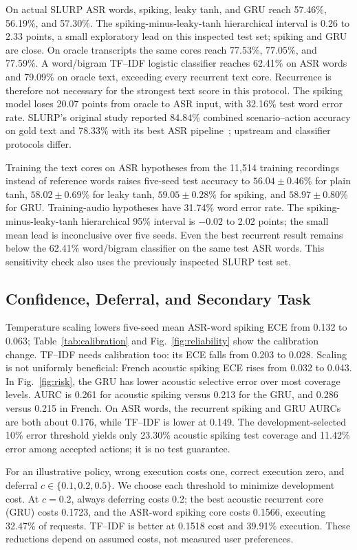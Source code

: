 \documentclass[conference]{IEEEtran}
\begin{document}
On actual SLURP ASR words, spiking, leaky tanh, and GRU reach 57.46\%, 56.19\%, and 57.30\%. The spiking-minus-leaky-tanh hierarchical interval is 0.26 to 2.33 points, a small exploratory lead on this inspected test set; spiking and GRU are close. On oracle transcripts the same cores reach 77.53\%, 77.05\%, and 77.59\%. A word/bigram TF--IDF logistic classifier reaches 62.41\% on ASR words and 79.09\% on oracle text, exceeding every recurrent text core. Recurrence is therefore not necessary for the strongest text score in this protocol. The spiking model loses 20.07 points from oracle to ASR input, with 32.16\% test word error rate. SLURP's original study reported 84.84\% combined scenario--action accuracy on gold text and 78.33\% with its best ASR pipeline~\cite{slurp}; upstream and classifier protocols differ.

Training the text cores on ASR hypotheses from the 11,514 training recordings instead of reference words raises five-seed test accuracy to $56.04\pm0.46$\% for plain tanh, $58.02\pm0.69$\% for leaky tanh, $59.05\pm0.28$\% for spiking, and $58.97\pm0.80$\% for GRU. Training-audio hypotheses have 31.74\% word error rate. The spiking-minus-leaky-tanh hierarchical 95\% interval is $-0.02$ to 2.02 points; the small mean lead is inconclusive over five seeds. Even the best recurrent result remains below the 62.41\% word/bigram classifier on the same test ASR words. This sensitivity check also uses the previously inspected SLURP test set.

\subsection{Confidence, Deferral, and Secondary Task}
Temperature scaling lowers five-seed mean ASR-word spiking ECE from 0.132 to 0.063; Table~\ref{tab:calibration} and Fig.~\ref{fig:reliability} show the calibration change. TF--IDF needs calibration too: its ECE falls from 0.203 to 0.028. Scaling is not uniformly beneficial: French acoustic spiking ECE rises from 0.032 to 0.043. In Fig.~\ref{fig:risk}, the GRU has lower acoustic selective error over most coverage levels. AURC is 0.261 for acoustic spiking versus 0.213 for the GRU, and 0.286 versus 0.215 in French. On ASR words, the recurrent spiking and GRU AURCs are both about 0.176, while TF--IDF is lower at 0.149. The development-selected 10\% error threshold yields only 23.30\% acoustic spiking test coverage and 11.42\% error among accepted actions; it is no test guarantee.

For an illustrative policy, wrong execution costs one, correct execution zero, and deferral $c\in\{0.1,0.2,0.5\}$. We choose each threshold to minimize development cost. At $c=0.2$, always deferring costs 0.2; the best acoustic recurrent core (GRU) costs 0.1723, and the ASR-word spiking core costs 0.1566, executing 32.47\% of requests. TF--IDF is better at 0.1518 cost and 39.91\% execution. These reductions depend on assumed costs, not measured user preferences.
\end{document}
